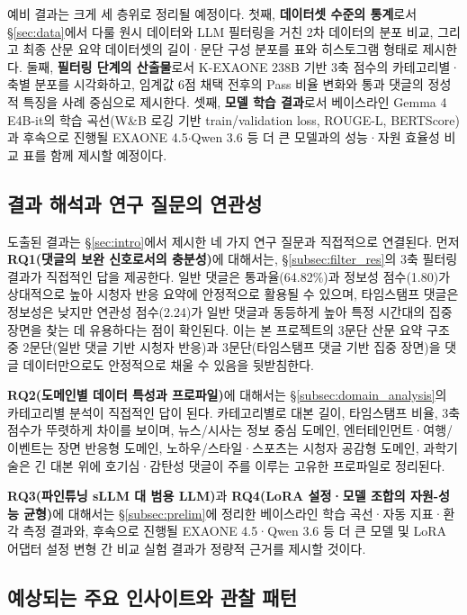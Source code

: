 \documentclass[11pt,a4paper]{article}
\begin{document}
예비 결과는 크게 세 층위로 정리될 예정이다. 첫째, \textbf{데이터셋 수준의 통계}로서 \S\ref{sec:data}에서 다룰 원시 데이터와 LLM 필터링을 거친 2차 데이터의 분포 비교, 그리고 최종 산문 요약 데이터셋의 길이·문단 구성 분포를 표와 히스토그램 형태로 제시한다. 둘째, \textbf{필터링 단계의 산출물}로서 K-EXAONE 238B 기반 3축 점수의 카테고리별·축별 분포를 시각화하고, 임계값 6점 채택 전후의 Pass 비율 변화와 통과 댓글의 정성적 특징을 사례 중심으로 제시한다. 셋째, \textbf{모델 학습 결과}로서 베이스라인 Gemma 4 E4B-it의 학습 곡선(W\&B 로깅 기반 train/validation loss, ROUGE-L, BERTScore)과 후속으로 진행될 EXAONE 4.5$\cdot$Qwen 3.6 등 더 큰 모델과의 성능·자원 효율성 비교 표를 함께 제시할 예정이다.

\subsection{결과 해석과 연구 질문의 연관성}

도출된 결과는 \S\ref{sec:intro}에서 제시한 네 가지 연구 질문과 직접적으로 연결된다. 먼저 \textbf{RQ1(댓글의 보완 신호로서의 충분성)}에 대해서는, \S\ref{subsec:filter_res}의 3축 필터링 결과가 직접적인 답을 제공한다. 일반 댓글은 통과율(64.82\%)과 정보성 점수(1.80)가 상대적으로 높아 시청자 반응 요약에 안정적으로 활용될 수 있으며, 타임스탬프 댓글은 정보성은 낮지만 연관성 점수(2.24)가 일반 댓글과 동등하게 높아 특정 시간대의 집중 장면을 찾는 데 유용하다는 점이 확인된다. 이는 본 프로젝트의 3문단 산문 요약 구조 중 2문단(일반 댓글 기반 시청자 반응)과 3문단(타임스탬프 댓글 기반 집중 장면)을 댓글 데이터만으로도 안정적으로 채울 수 있음을 뒷받침한다.

\textbf{RQ2(도메인별 데이터 특성과 프로파일)}에 대해서는 \S\ref{subsec:domain_analysis}의 카테고리별 분석이 직접적인 답이 된다. 카테고리별로 대본 길이, 타임스탬프 비율, 3축 점수가 뚜렷하게 차이를 보이며, 뉴스/시사는 정보 중심 도메인, 엔터테인먼트·여행/이벤트는 장면 반응형 도메인, 노하우/스타일·스포츠는 시청자 공감형 도메인, 과학기술은 긴 대본 위에 호기심·감탄성 댓글이 주를 이루는 고유한 프로파일로 정리된다.

\textbf{RQ3(파인튜닝 sLLM 대 범용 LLM)}과 \textbf{RQ4(LoRA 설정·모델 조합의 자원-성능 균형)}에 대해서는 \S\ref{subsec:prelim}에 정리한 베이스라인 학습 곡선·자동 지표·환각 측정 결과와, 후속으로 진행될 EXAONE 4.5·Qwen 3.6 등 더 큰 모델 및 LoRA 어댑터 설정 변형 간 비교 실험 결과가 정량적 근거를 제시할 것이다.

\subsection{예상되는 주요 인사이트와 관찰 패턴}
\end{document}
